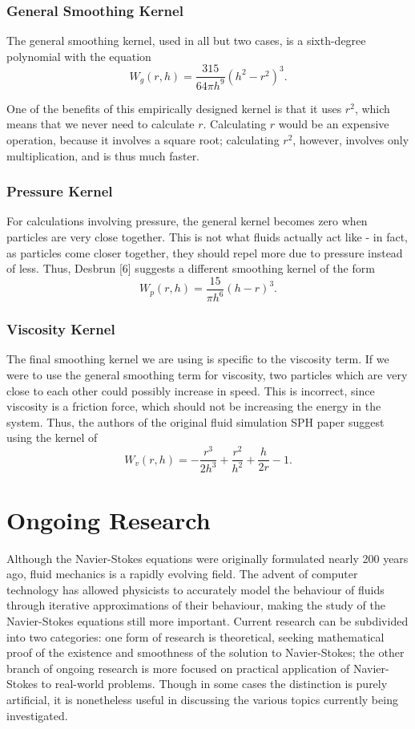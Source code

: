 \documentclass[a4paper,twocolumn]{article}
\begin{document}
\subsubsection{General Smoothing Kernel}
The general smoothing kernel, used in all but two cases, is a sixth-degree polynomial with the equation
\[W_{g}(r, h) = \frac{315}{64\pi h^9} \left(h^2 - r^2\right)^3.\]

One of the benefits of this empirically designed kernel is that it uses $r^2$, which means that we never need to calculate $r$. Calculating $r$ would be an expensive operation, because it involves a square root; calculating $r^2$, however, involves only multiplication, and is thus much faster.

\subsubsection{Pressure Kernel}
For calculations involving pressure, the general kernel becomes zero when particles are very close together. This is not what fluids actually act like - in fact, as particles come closer together, they should repel more due to pressure instead of less. Thus, Desbrun [6] suggests a different smoothing kernel of the form
\[W_{p}( r, h) = \frac{15}{\pi h^6} \left(h - r\right)^3.\]

\subsubsection{Viscosity Kernel}
The final smoothing kernel we are using is specific to the viscosity term. If we were to use the general smoothing term for viscosity, two particles which are very close to each other could possibly increase in speed. This is incorrect, since viscosity is a friction force, which should not be increasing the energy in the system. Thus, the authors of the original fluid simulation SPH paper suggest using the kernel of
\[W_{v}(r, h) = -\frac{r^3}{2h^3} + \frac{r^2}{h^2} + \frac{h}{2r} - 1.\]

\section{Ongoing Research}
Although the Navier-Stokes equations were originally formulated nearly 200 years ago, fluid mechanics is a rapidly evolving field. The advent of computer technology has allowed physicists to accurately model the behaviour of fluids through iterative approximations of their behaviour, making the study of the Navier-Stokes equations still more important. Current research can be subdivided into two categories: one form of research is theoretical, seeking mathematical proof of the existence and smoothness of the solution to Navier-Stokes; the other branch of ongoing research is more focused on practical application of Navier-Stokes to real-world problems. Though in some cases the distinction is purely artificial, it is nonetheless useful in discussing the various topics currently being investigated.
\end{document}
